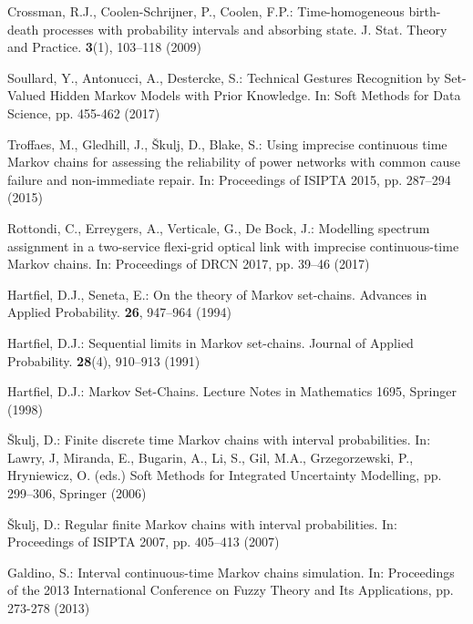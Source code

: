\begin{thebibliography}{99.}
Crossman, R.J., Coolen-Schrijner, P., Coolen, F.P.: {Time-homogeneous birth-death processes with probability intervals and absorbing state}. J. Stat. Theory and Practice. \textbf{3}(1), 103--118 (2009)

Soullard, Y., Antonucci, A., Destercke, S.: {Technical Gestures Recognition by Set-Valued Hidden Markov Models with Prior Knowledge}. In: Soft Methods for Data Science, pp. 455-462 (2017)

Troffaes, M., Gledhill, J., {\v{S}}kulj, D., Blake, S.: {Using imprecise continuous time Markov chains for assessing the reliability of power networks with common cause failure and non-immediate repair}. In: Proceedings of ISIPTA 2015, pp. 287--294 (2015)

Rottondi, C., Erreygers, A., Verticale, G., De Bock, J.: {Modelling spectrum assignment in a two-service flexi-grid optical link with imprecise continuous-time Markov chains}. In: Proceedings of DRCN 2017, pp. 39--46 (2017)



Hartfiel, D.J., Seneta, E.: {On the theory of Markov set-chains}.
Advances in Applied Probability. \textbf{26}, 947--964 (1994)

Hartfiel, D.J.: {Sequential limits in Markov set-chains}.
Journal of Applied Probability. \textbf{28}(4), 910--913 (1991)

Hartfiel, D.J.: {Markov Set-Chains}. Lecture Notes in Mathematics 1695, Springer (1998)


{\v{S}}kulj,  D.: {Finite  discrete  time  Markov  chains  with  interval  probabilities}. In: Lawry, J, Miranda, E., Bugarin, A., Li, S., Gil, M.A.,  Grzegorzewski,  P., Hryniewicz, O. (eds.)
Soft Methods for Integrated Uncertainty Modelling, pp. 299--306, Springer (2006)

{\v{S}}kulj, D.: {Regular finite Markov chains with interval probabilities}. In: Proceedings of ISIPTA 2007, pp. 405--413 (2007)

Galdino, S.: {Interval continuous-time Markov chains simulation}. In: Proceedings of the 2013 International Conference on Fuzzy Theory and Its Applications, pp. 273-278 (2013)


\end{thebibliography}

